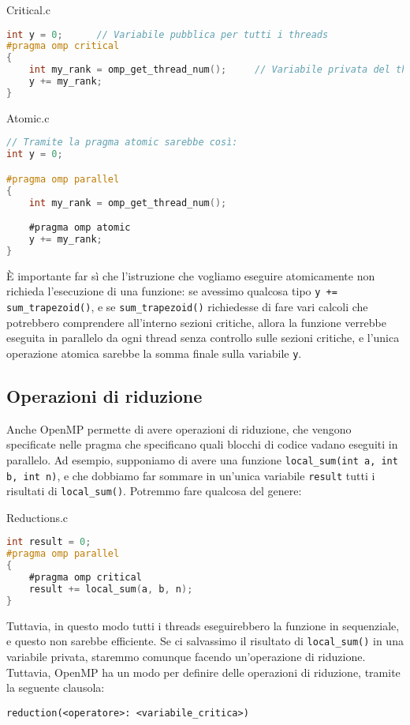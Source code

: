 \begin{codeblock}{Critical.c}
    \begin{lstlisting}[language = C]
int y = 0;      // Variabile pubblica per tutti i threads
#pragma omp critical
{   
    int my_rank = omp_get_thread_num();     // Variabile privata del thread
    y += my_rank;
}\end{lstlisting}
\end{codeblock}
\pagebreak
\begin{codeblock}{Atomic.c}
    \begin{lstlisting}[language = C]
// Tramite la pragma atomic sarebbe così:
int y = 0;

#pragma omp parallel
{
    int my_rank = omp_get_thread_num();

    #pragma omp atomic
    y += my_rank;
}\end{lstlisting}
\end{codeblock}

È importante far sì che l'istruzione che vogliamo eseguire atomicamente non richieda l'esecuzione di una funzione: se avessimo qualcosa tipo \verb|y += sum_trapezoid()|, e se \verb|sum_trapezoid()| richiedesse di fare vari calcoli che potrebbero comprendere all'interno sezioni critiche, allora la funzione verrebbe eseguita in parallelo da ogni thread senza controllo sulle sezioni critiche, e l'unica operazione atomica sarebbe la somma finale sulla variabile \verb|y|.

\subsection{Operazioni di riduzione}

Anche OpenMP permette di avere operazioni di riduzione, che vengono specificate nelle pragma che specificano quali blocchi di codice vadano eseguiti in parallelo. Ad esempio, supponiamo di avere una funzione \verb|local_sum(int a, int b, int n)|, e che dobbiamo far sommare in un'unica variabile \verb|result| tutti i risultati di \verb|local_sum()|. Potremmo fare qualcosa del genere:

\begin{codeblock}{Reductions.c}
    \begin{lstlisting}[language = C]
int result = 0;
#pragma omp parallel
{
    #pragma omp critical
    result += local_sum(a, b, n);
}\end{lstlisting}
\end{codeblock}

Tuttavia, in questo modo tutti i threads eseguirebbero la funzione in sequenziale, e questo non sarebbe efficiente. Se ci salvassimo il risultato di \verb|local_sum()| in una variabile privata, staremmo comunque facendo un'operazione di riduzione. Tuttavia, OpenMP ha un modo per definire delle operazioni di riduzione, tramite la seguente clausola:
\begin{center}
    \verb|reduction(<operatore>: <variabile_critica>)|
\end{center}

